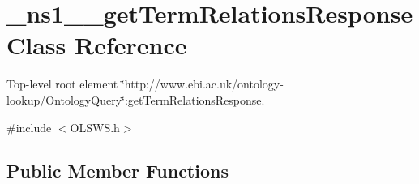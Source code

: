 \hypertarget{class__ns1____getTermRelationsResponse}{
\section{\_\-ns1\_\-\_\-getTermRelationsResponse Class Reference}
\label{class__ns1____getTermRelationsResponse}
}


Top-\/level root element \char`\"{}http://www.ebi.ac.uk/ontology-\/lookup/OntologyQuery\char`\"{}:getTermRelationsResponse.  




{\ttfamily \#include $<$OLSWS.h$>$}

\subsection*{Public Member Functions}

